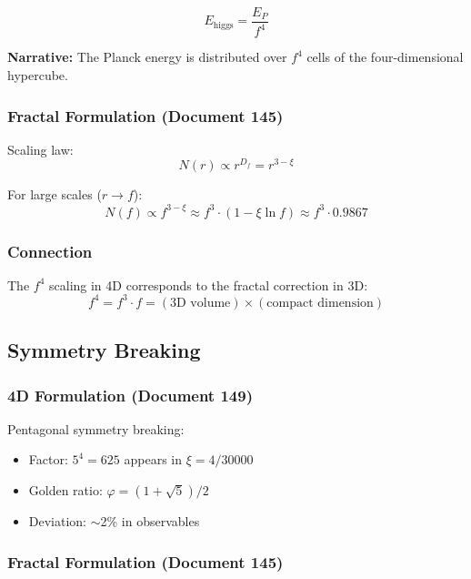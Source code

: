 	\begin{equation}
		E_{\text{higgs}} = \frac{E_P}{f^4}
	\end{equation}
	
	\textbf{Narrative:} The Planck energy is distributed over $f^4$ cells of the four-dimensional hypercube.
	
	\subsubsection{Fractal Formulation (Document 145)}
	
	Scaling law:
	\begin{equation}
		N(r) \propto r^{D_f} = r^{3-\xi}
	\end{equation}
	
	For large scales ($r \to f$):
	\begin{equation}
		N(f) \propto f^{3-\xi} \approx f^3 \cdot (1 - \xi \ln f) \approx f^3 \cdot 0.9867
	\end{equation}
	
	\subsubsection{Connection}
	
	The $f^4$ scaling in 4D corresponds to the fractal correction in 3D:
	\begin{equation}
		\boxed{f^4 = f^3 \cdot f = (\text{3D volume}) \times (\text{compact dimension})}
	\end{equation}
	
	\subsection{Symmetry Breaking}
	
	\subsubsection{4D Formulation (Document 149)}
	
	Pentagonal symmetry breaking:
	\begin{itemize}
		\item Factor: $5^4 = 625$ appears in $\xi = 4/30000$
		\item Golden ratio: $\varphi = (1+\sqrt{5})/2$
		\item Deviation: $\sim$2\% in observables
	\end{itemize}
	
	\subsubsection{Fractal Formulation (Document 145)}
	
